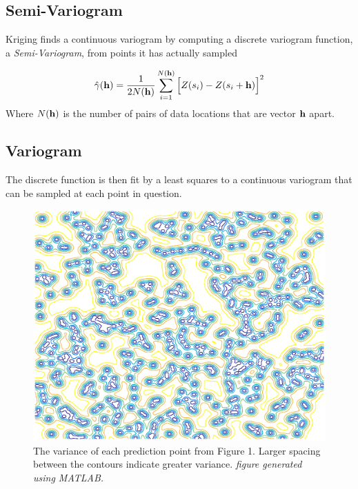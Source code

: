 \documentclass[11pt]{ucthesis}
\begin{document}
\subsection{Semi-Variogram}
Kriging finds a continuous variogram by computing a discrete variogram function, a \textit{Semi-Variogram}, from points it has actually sampled

\begin{equation}
\hat{\gamma}({\bf{h}})=\dfrac{1}{2N({\bf{h}})}\sum_{i=1}^{N({\bf{h}})}\Big[Z(s_{i})-Z(s_{i}+{\bf{h}})\Big]^{2}
\end{equation}
Where $N({\bf{h}})$ is the number of pairs of data locations that are vector ${\bf{h}}$ apart.

\subsection{Variogram}
The discrete function is then fit by a least squares to a continuous variogram that can be sampled at each point in question.

\begin{center}
	\begin{figure}[h]
		\centering
		\includegraphics[scale=.5]{kriging_variance.eps}
		\caption{The variance of each prediction point from Figure 1. Larger spacing between the contours indicate greater variance. \textit{figure generated using MATLAB.}}
	\end{figure}
\end{center}

\end{document}
